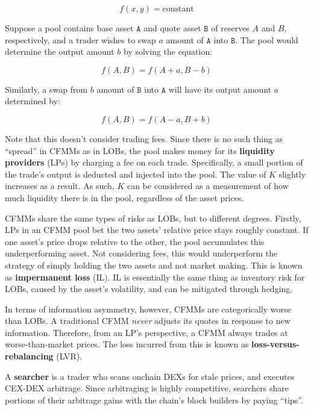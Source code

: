 \documentclass{article}
\begin{document}
\begin{equation}
  f(x, y) = \mathrm{constant}
\end{equation}

Suppose a pool contains base asset $\mathtt{A}$ and quote asset $\mathtt{B}$ of reserves $A$ and $B$, respectively, and a trader wishes to swap $a$ amount of $\mathtt{A}$ into $\mathtt{B}$. The pool would determine the output amount $b$ by solving the equation:

\begin{equation}
  f(A, B) = f(A + a, B - b)
\end{equation}

Similarly, a swap from $b$ amount of $\mathtt{B}$ into $\mathtt{A}$ will have its output amount $a$ determined by:

\begin{equation}
  f(A, B) = f(A - a, B + b)
\end{equation}

Note that this doesn't consider trading fees. Since there is no such thing as ``spread'' in CFMMs as in LOBs, the pool makes money for its \textbf{liquidity providers} (LPs) by charging a fee on each trade. Specifically, a small portion of the trade's output is deducted and injected into the pool. The value of $K$ slightly increases as a result. As such, $K$ can be considered as a measurement of how much liquidity there is in the pool, regardless of the asset prices.

CFMMs share the same types of risks as LOBs, but to different degrees. Firstly, LPs in an CFMM pool bet the two assets' relative price stays roughly constant. If one asset's price drops relative to the other, the pool accumulates this underperforming asset. Not considering fees, this would underperform the strategy of simply holding the two assets and not market making. This is known as \textbf{impermanent loss} (IL). IL is essentially the same thing as inventory risk for LOBs, caused by the asset's volatility, and can be mitigated through hedging.

In terms of information asymmetry, however,  CFMMs are categorically worse than LOBs. A traditional CFMM \textit{never} adjusts its quotes in response to new information. Therefore, from an LP's perspective, a CFMM always trades at worse-than-market prices. The loss incurred from this is known as \textbf{loss-versus-rebalancing} (LVR).\supercite{lvr}

A \textbf{searcher} is a trader who scans onchain DEXs for stale prices, and executes CEX-DEX arbitrage. Since arbitraging is highly competitive, searchers share portions of their arbitrage gains with the chain's block builders by paying ``tips''.
\end{document}
